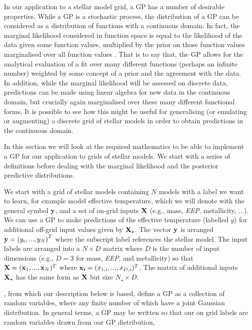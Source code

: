 In our application to a stellar model grid, a GP has a number of desirable properties. While a GP is a stochastic process, the distribution of a GP can be considered as a distribution of functions with a continuous domain.  In fact,  the marginal likelihood considered in function space is equal to the likelihood of the data given some function values,  multiplied by the prior on those function values marginalised over all function values \cite{williams1996gaussian}.  That is to say that, the GP allows for the analytical evaluation of a fit over many different functions (perhaps an infinite number) weighted by some concept of a prior and the agreement with the data. In addition, while the marginal likelihood will be assessed on discrete data,  predictions can be made using linear algebra for new data in the continuous domain, but crucially again marginalised over these many different functional forms.  It is possible to see how this might be useful for generalising (or emulating or augmenting) a discrete grid of stellar models in order to obtain predictions in the continuous domain.

In this section we will look at the required mathematics to be able to implement a GP for our application to grids of stellar models.  We start with a series of definitions before dealing with the marginal likelihood and the posterior predictive distributions. 

We start with a grid of stellar models containing $N$ models with a label we want to learn, for example model effective temperature, which we will denote with the general symbol $\bf y$, and a set of on-grid inputs $\bf X$ (e.g., mass,  {\it EEP},  metallicity,  ...).  We can use a GP to make predictions of the effective temperature (labelled $y$) for additional off-grid input values given by $\bf X_{\star}$.  The vector $\bf y$ is arranged ${\bf y} = \left(y_{i}, ... ,y_{N} \right)^{T}$ where the subscript label references the stellar model.  The input labels are arranged into a $N \times D$ matrix where $D$ is the number of input dimensions (e.g., $D=3$ for mass, {\it EEP}, and metallicity) so that ${\bf X} = ({\bf x}_{1}, ..., {\bf x}_{N})^{T}$ where ${\bf x_{i}} = (x_{1, i}, ..., x_{D, i})^{T}$.  The matrix of additional inputs $\bf X_{\star}$ has the same form as $\bf X$ but size $N_{\star} \times D$.

\citet{williams1996gaussian}, from which our description below is based,  define a GP as a collection of random variables, where any finite number of which have a joint Gaussian distribution.  In general terms,  a GP may be written so that our on grid labels are random variables drawn from our GP distribution, 

